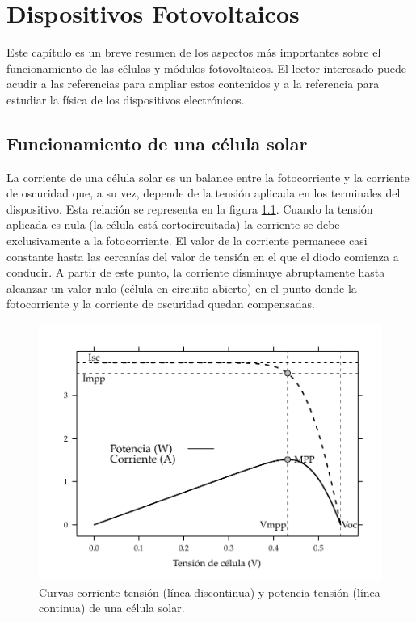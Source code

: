 \chapter{Dispositivos Fotovoltaicos\label{cha:DispositivosFotovoltaicos}}

Este capítulo es un breve resumen de los aspectos más importantes
sobre el funcionamiento de las células y módulos fotovoltaicos. El
lector interesado puede acudir a las referencias \cite{Lorenzo2006c,Green1995,Wenham.Green.ea2000}
para ampliar estos contenidos y a la referencia \cite{LopezAraujo1986}
para estudiar la física de los dispositivos electrónicos.


\section{Funcionamiento de una célula solar}

La corriente de una célula solar es un balance entre la fotocorriente
y la corriente de oscuridad que, a su vez, depende de la tensión aplicada
en los terminales del dispositivo. Esta relación se representa en
la figura \ref{fig:CurvaIVCelula}. Cuando la tensión aplicada es
nula (la célula está cortocircuitada) la corriente se debe exclusivamente
a la fotocorriente. El valor de la corriente permanece casi constante
hasta las cercanías del valor de tensión en el que el diodo comienza
a conducir. A partir de este punto, la corriente disminuye abruptamente
hasta alcanzar un valor nulo (célula en circuito abierto) en el punto
donde la fotocorriente y la corriente de oscuridad quedan compensadas. 


%
\begin{figure}
\begin{centering}
\includegraphics[scale=0.75]{../figs/CurvaIV_Ta20_G800}
\end{centering}

\caption[Curvas corriente-tensión y potencia-tensión de una célula solar]{Curvas corriente-tensión (línea discontinua) y potencia-tensión (línea
continua) de una célula solar.\label{fig:CurvaIVCelula}}

\end{figure}



